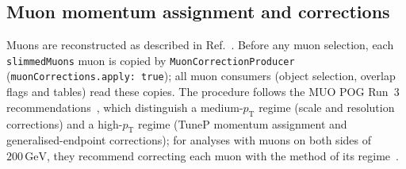 \documentclass[11pt]{article}
\newcommand{\pt}{p_{\mathrm{T}}}
\newcommand{\GeV}{\ensuremath{\,\mathrm{GeV}}}
\newcommand{\code}[1]{\texttt{#1}}
\begin{document}
\subsection{Muon momentum assignment and corrections}
\label{sec:muoncorr}
Muons are reconstructed as described in Ref.~\cite{CMS:2018rym}. Before any muon selection, each \code{slimmedMuons}
muon is copied by \code{MuonCorrectionProducer} (\code{muonCorrections.apply: true}); all muon consumers (object
selection, overlap flags and tables) read these copies. The procedure follows the MUO POG Run~3
recommendations~\cite{MUOcorrections,MUOscare,MUOrecommendations}, which distinguish a medium-$\pt$ regime (scale and
resolution corrections) and a high-$\pt$ regime (TuneP momentum assignment and generalised-endpoint corrections); for
analyses with muons on both sides of $200\GeV$, they recommend correcting each muon with the method of its
regime~\cite{MUOcorrections}.
\end{document}
